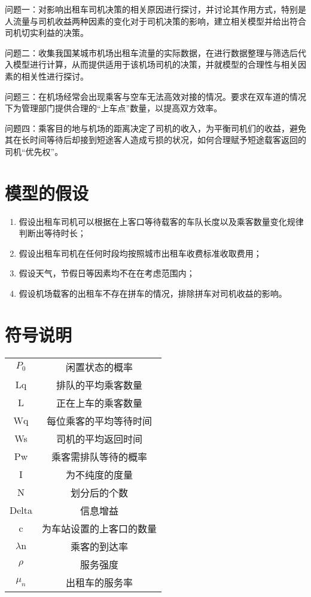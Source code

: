 \documentclass[withoutpreface,bwprint]{cumcmthesis} %
\begin{document}
问题一：对影响出租车司机决策的相关原因进行探讨，并讨论其作用方式，特别是人流量与司机收益两种因素的变化对于司机决策的影响，建立相关模型并给出符合司机切实利益的决策。

问题二：收集我国某城市机场出租车流量的实际数据，在进行数据整理与筛选后代入模型进行计算，从而提供适用于该机场司机的决策，并就模型的合理性与相关因素的相关性进行探讨。

问题三：在机场经常会出现乘客与空车无法高效对接的情况。要求在双车道的情况下为管理部门提供合理的“上车点”数量，以提高双方效率。

问题四：乘客目的地与机场的距离决定了司机的收入，为平衡司机们的收益，避免其在长时间等待后却接到短途客人造成亏损的状况，如何合理赋予短途载客返回的司机“优先权”。
\section{模型的假设}
\begin{enumerate}
	\item 假设出租车司机可以根据在上客口等待载客的车队长度以及乘客数量变化规律判断出等待时长；
	\item 假设出租车司机在任何时段均按照城市出租车收费标准收取费用；
	\item 假设天气，节假日等因素均不在在考虑范围内；
	\item 假设机场载客的出租车不存在拼车的情况，排除拼车对司机收益的影响。
\end{enumerate}

\section{符号说明}
\begin{center}
	\begin{tabular}{cc}
		\hline
		\makebox[0.3\textwidth][c]{符号}	&  \makebox[0.4\textwidth][c]{意义} \\ \hline
		$P_0$	    & 闲置状态的概率\\ \hline
		Lq	    & 排队的平均乘客数量\\ \hline
		L     & 正在上车的乘客数量\\ \hline
		Wq     &  每位乘客的平均等待时间\\ \hline
		Ws	    & 司机的平均返回时间\\ \hline
		Pw	    & 乘客需排队等待的概率\\ \hline
		I	    & 为不纯度的度量\\ \hline
		N   & 划分后的个数\\ \hline
		Delta	    & 信息增益\\ \hline
		c   & 为车站设置的上客口的数量\\ \hline
		$\lambda \mathrm{n}$   & 乘客的到达率\\ \hline
		$\rho$   & 服务强度\\ \hline
		$\mu_{n}$   & 出租车的服务率\\ \hline
		
	\end{tabular}
\end{center}
\end{document}
